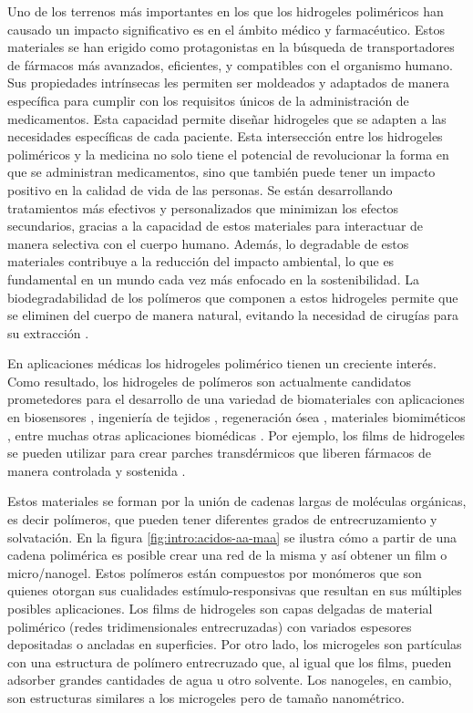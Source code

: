  Uno de los terrenos m\'as importantes en los que los hidrogeles polim\'ericos han causado un impacto significativo es en el \'ambito m\'edico y farmac\'eutico. Estos materiales se han erigido como protagonistas en la b\'usqueda de transportadores de f\'armacos m\'as avanzados, eficientes, y compatibles con el organismo humano. Sus propiedades intr\'insecas les permiten ser moldeados y adaptados de manera espec\'ifica para cumplir con los requisitos \'unicos de la administraci\'on de medicamentos.
Esta capacidad permite dise\~nar hidrogeles  que se adapten a las necesidades espec\'ificas de cada paciente.
Esta intersecci\'on entre los hidrogeles polim\'ericos y la medicina no solo tiene el potencial de revolucionar la forma en que se administran medicamentos, sino que tambi\'en puede tener un impacto positivo en la calidad de vida de las personas. Se est\'an desarrollando tratamientos m\'as efectivos y personalizados que minimizan los efectos secundarios, gracias a la capacidad de estos materiales para interactuar de manera selectiva con el cuerpo humano. Adem\'as, lo degradable de estos materiales contribuye a la reducci\'on del impacto ambiental, lo que es fundamental en un mundo cada vez m\'as enfocado en la sostenibilidad.
La biodegradabilidad de los pol\'imeros que componen a estos hidrogeles permite que se eliminen del cuerpo de manera natural, evitando la necesidad de cirug\'ias para su extracci\'on \cite{samir2022recent}.

En aplicaciones m\'edicas los hidrogeles polim\'erico tienen  un creciente inter\'es. 
Como resultado, los hidrogeles de pol\'imeros son actualmente candidatos prometedores para el desarrollo de una variedad de biomateriales con aplicaciones en biosensores \cite{zhang2012ultrathin,islam2014responsive}, ingenier\'ia de tejidos \cite{matricardi2013interpenetrating,van2011biopolymer}, regeneraci\'on \'osea \cite{bai2018bioactive}, materiales biomim\'eticos \cite{green2016mimicking,wu2010multifunctional}, entre muchas otras aplicaciones biom\'edicas \cite{Daly2020}.
Por ejemplo, los films de  hidrogeles se pueden utilizar para crear parches transd\'ermicos que liberen f\'armacos de manera controlada y sostenida  \cite{indulekha2016thermoresponsive}.

Estos materiales se forman por la uni\'on de cadenas largas de mol\'eculas org\'anicas, es decir pol\'imeros, que pueden tener diferentes grados de entrecruzamiento y solvataci\'on. En la figura \ref{fig:intro:acidos-aa-maa} se ilustra c\'omo a partir de una cadena polim\'erica es posible crear una red de la misma y as\'i obtener un film o micro/nanogel. Estos pol\'imeros est\'an compuestos por mon\'omeros que son quienes otorgan sus cualidades est\'imulo-responsivas que resultan en sus m\'ultiples posibles aplicaciones.
Los films de hidrogeles son capas delgadas de material polim\'erico (redes tridimensionales entrecruzadas) con variados espesores depositadas o ancladas en superficies. Por otro lado, los microgeles son part\'iculas con una estructura de pol\'imero entrecruzado que, al igual que los films, pueden adsorber grandes cantidades de agua u otro solvente. Los nanogeles, en cambio, son estructuras similares a los microgeles pero de tama\~no nanom\'etrico.

